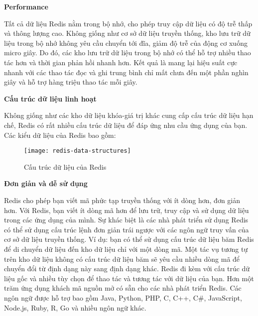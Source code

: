 \textbf{Performance}

Tất cả dữ liệu Redis nằm trong bộ nhớ, cho phép truy cập dữ liệu có độ trễ thấp và thông lượng cao. Không giống như cơ sở dữ liệu truyền thống, kho lưu trữ dữ liệu trong bộ nhớ không yêu cầu chuyển tới đĩa, giảm độ trễ của động cơ xuống micro giây. Do đó, các kho lưu trữ dữ liệu trong bộ nhớ có thể hỗ trợ nhiều thao tác hơn và thời gian phản hồi nhanh hơn. Kết quả là mang lại hiệu suất cực nhanh với các thao tác đọc và ghi trung bình chỉ mất chưa đến một phần nghìn giây và hỗ trợ hàng triệu thao tác mỗi giây.

\textbf{Cấu trúc dữ liệu linh hoạt}

Không giống như các kho dữ liệu khóa-giá trị khác cung cấp cấu trúc dữ liệu hạn chế, Redis có rất nhiều cấu trúc dữ liệu để đáp ứng nhu cầu ứng dụng của bạn. Các kiểu dữ liệu của Redis bao gồm:

\begin{figure}[H]
	\centering
	\texttt{[image: redis-data-structures]}
	\caption{Cấu trúc dữ liệu của Redis}
\end{figure}

\begin{itemize}
\end{itemize}

\textbf{Đơn giản và dễ sử dụng}

Redis cho phép bạn viết mã phức tạp truyền thống với ít dòng hơn, đơn giản hơn. Với Redis, bạn viết ít dòng mã hơn để lưu trữ, truy cập và sử dụng dữ liệu trong các ứng dụng của mình. Sự khác biệt là các nhà phát triển sử dụng Redis có thể sử dụng cấu trúc lệnh đơn giản trái ngược với các ngôn ngữ truy vấn của cơ sở dữ liệu truyền thống. Ví dụ: bạn có thể sử dụng cấu trúc dữ liệu băm Redis để di chuyển dữ liệu đến kho dữ liệu chỉ với một dòng mã. Một tác vụ tương tự trên kho dữ liệu không có cấu trúc dữ liệu băm sẽ yêu cầu nhiều dòng mã để chuyển đổi từ định dạng này sang định dạng khác. Redis đi kèm với cấu trúc dữ liệu gốc và nhiều tùy chọn để thao tác và tương tác với dữ liệu của bạn. Hơn một trăm ứng dụng khách mã nguồn mở có sẵn cho các nhà phát triển Redis. Các ngôn ngữ được hỗ trợ bao gồm Java, Python, PHP, C, C++, C\#, JavaScript, Node.js, Ruby, R, Go và nhiều ngôn ngữ khác.

